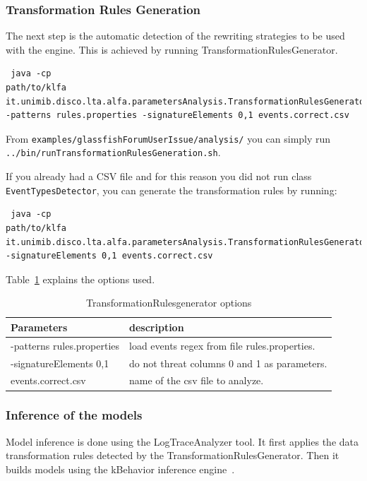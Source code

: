 \subsubsection{Transformation Rules Generation}

The next step is the automatic detection of the rewriting strategies
to be used with the engine. This is achieved by running
TransformationRulesGenerator.

\begin{verbatim}
 java -cp
path/to/klfa
it.unimib.disco.lta.alfa.parametersAnalysis.TransformationRulesGenerator
-patterns rules.properties -signatureElements 0,1 events.correct.csv
\end{verbatim}

From \texttt{examples/glassfishForumUserIssue/analysis/} you can simply run
\texttt{../bin/run\-TransformationRulesGeneration.sh}.

If you already had a CSV file and for this reason you did not run
class \texttt{EventTypesDetector}, you can generate the transformation rules by
running:

\begin{verbatim}
 java -cp
path/to/klfa
it.unimib.disco.lta.alfa.parametersAnalysis.TransformationRulesGenerator
-signatureElements 0,1 events.correct.csv
\end{verbatim}

Table~\ref{trg} explains the options used.

\begin{table}
 \begin{tabular}{|p{6cm}|p{4cm}|}
 \hline
Parameters&description\\
\hline
-patterns rules.properties&load events regex from file
rules.properties.\\
\hline
-signatureElements 0,1&do not threat columns 0 and 1 as parameters.\\
\hline
events.correct.csv& name of the csv file to analyze.\\
\hline
\end{tabular}
\label{trg}
\caption{TransformationRulesgenerator options}
\end{table}


\subsubsection{Inference of the models}

Model inference is done using the LogTraceAnalyzer tool. It first
applies the data transformation rules detected by the
TransformationRulesGenerator. Then it builds models using the
kBehavior inference engine~\cite{Mariani:COTS:IEEES:2007}.

